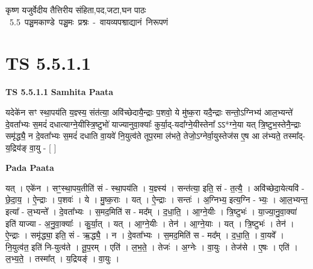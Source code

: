\documentclass[17pt]{extarticle}
\begin{document}
\begin{titlepage}
    \begin{center}
 
\begin{sanskrit}
    { \Large
    कृष्ण यजुर्वेदीय तैत्तिरीय संहिता,पद,जटा,घन पाठः 
    }
    \\
    \vspace{2.5cm}
    \mbox{ \Large
    5.5      पञ्चमकाण्डे पञ्चमः प्रश्नः - वायव्यपश्वाद्यानं निरूपणं   }
\end{sanskrit}
\end{center}

\end{titlepage}
\tableofcontents
{}
\pagebreak


\section{ TS 5.5.1.1 }

\textbf{TS 5.5.1.1 } \newline
\textbf{Samhita Paata} \newline

यदेके॑न सꣳ स्था॒पय॑ति य॒ज्ञ्स्य॒ संत॑त्या॒ अवि॑च्छेदायै॒न्द्राः प॒शवो॒ ये मु॑ष्क॒रा यदै॒न्द्राः सन्तो॒ऽग्निभ्य॑ आल॒भ्यन्ते॑ दे॒वता᳚भ्यः स॒मदं॑ दधात्याग्ने॒यीस्त्रि॒ष्टुभो॑ याज्यानुवा॒क्याः᳚ कुर्या॒द्-यदा᳚ग्ने॒यीस्तेना᳚ ऽऽ*ग्ने॒या यत् त्रि॒ष्टुभ॒स्तेनै॒न्द्राः समृ॑द्ध्यै॒ न दे॒वता᳚भ्यः स॒मदं॑ दधाति वा॒यवे॑ नि॒युत्व॑ते तूप॒रमा ल॑भते॒ तेजो॒ऽग्नेर्वा॒युस्तेज॑स ए॒ष आ ल॑भ्यते॒ तस्मा᳚द्-य॒द्रिय॑ङ् वा॒यु - [  ] \newline

\textbf{Pada Paata} \newline

यत् । एके॑न । सꣳ॒॒स्था॒पय॒तीति॑ सं - स्था॒पय॑ति । य॒ज्ञ्स्य॑ । सन्त॑त्या॒ इति॒ सं - त॒त्यै॒ । अवि॑च्छेदा॒येत्यवि॑ - छे॒दा॒य॒ । ऐ॒न्द्राः । प॒शवः॑ । ये । मु॒ष्क॒राः । यत् । ऐ॒न्द्राः । सन्तः॑ । अ॒ग्निभ्य॒ इत्य॒ग्नि - भ्यः॒ । आ॒ल॒भ्यन्त॒ इत्या᳚ - ल॒भ्यन्ते᳚ । दे॒वता᳚भ्यः । स॒मद॒मिति॑ स - मद᳚म् । द॒धा॒ति॒ । आ॒ग्ने॒यीः । त्रि॒ष्टुभः॑ । या॒ज्या॒नु॒वा॒क्या॑ इति॑ याज्या - अ॒नु॒वा॒क्याः᳚ । कु॒र्या॒त् । यत् । आ॒ग्ने॒यीः । तेन॑ । आ॒ग्ने॒याः । यत् । त्रि॒ष्टुभः॑ । तेन॑ । ऐ॒न्द्राः । समृ॑द्ध्या॒ इति॒ सं - ऋ॒द्ध्यै॒ । न । दे॒वता᳚भ्यः । स॒मद॒मिति॑ स - मद᳚म् । द॒धा॒ति॒ । वा॒यवे᳚ । नि॒युत्व॑त॒ इति॑ नि-युत्व॑ते । तू॒प॒रम् । एति॑ । ल॒भ॒ते॒ । तेजः॑ । अ॒ग्नेः । वा॒युः । तेज॑से । ए॒षः । एति॑ । ल॒भ्य॒ते॒ । तस्मा᳚त् । य॒द्रियङ्॑ । वा॒युः ।  \newline
\end{document}
